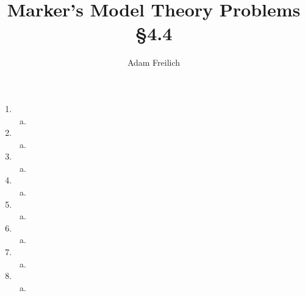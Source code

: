 \documentclass[10pt]{article}
\author{Adam Freilich}
\title{Marker's Model Theory Problems \S 4.4}
\begin{document}
\maketitle

\begin{enumerate}[1.]
\item
 
  \begin{enumerate}[a)] 
  \item 	
  \end{enumerate}

\item
 
  \begin{enumerate}[a)] 
  \item 	
  \end{enumerate}

\item
 
  \begin{enumerate}[a)] 
  \item 	
  \end{enumerate}

\item
 
  \begin{enumerate}[a)] 
  \item 	
  \end{enumerate}

\item
 
  \begin{enumerate}[a)] 
  \item 	
  \end{enumerate}

\item
 
  \begin{enumerate}[a)] 
  \item 	
  \end{enumerate}

\item
 
  \begin{enumerate}[a)] 
  \item 	
  \end{enumerate}

\item
 
  \begin{enumerate}[a)] 
  \item 	
  \end{enumerate}


\end{enumerate}
\end{document}
